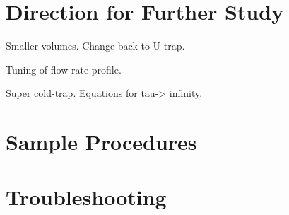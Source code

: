 \documentclass[12pt]{article}
\begin{document}
\section{Direction for Further Study}
Smaller volumes. Change back to U trap. 

Tuning of flow rate profile.

Super cold-trap. Equations for tau-> infinity.




\appendix
\section{Sample Procedures}
\label{ap:procedures}
\section{Troubleshooting}



{}

\end{document}
